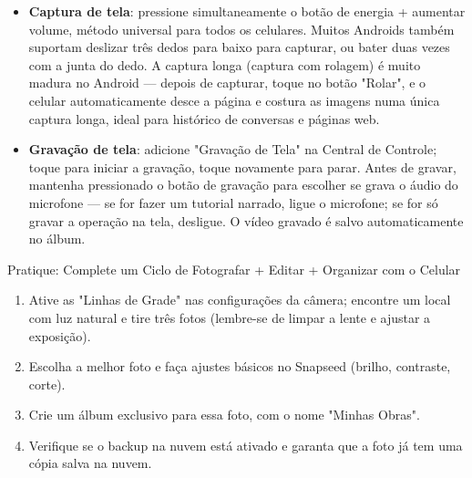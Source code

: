 \begin{itemize}
  \item \textbf{Captura de tela}: pressione simultaneamente o botão de energia + aumentar volume, método universal para todos os celulares. Muitos Androids também suportam deslizar três dedos para baixo para capturar, ou bater duas vezes com a junta do dedo. A captura longa (captura com rolagem) é muito madura no Android — depois de capturar, toque no botão "Rolar", e o celular automaticamente desce a página e costura as imagens numa única captura longa, ideal para histórico de conversas e páginas web.
  \item \textbf{Gravação de tela}: adicione "Gravação de Tela" na Central de Controle; toque para iniciar a gravação, toque novamente para parar. Antes de gravar, mantenha pressionado o botão de gravação para escolher se grava o áudio do microfone — se for fazer um tutorial narrado, ligue o microfone; se for só gravar a operação na tela, desligue. O vídeo gravado é salvo automaticamente no álbum.
\end{itemize}

\begin{tcbpractice}{Pratique: Complete um Ciclo de Fotografar + Editar + Organizar com o Celular}
\begin{enumerate}
  \item Ative as "Linhas de Grade" nas configurações da câmera; encontre um local com luz natural e tire três fotos (lembre-se de limpar a lente e ajustar a exposição).
  \item Escolha a melhor foto e faça ajustes básicos no Snapseed (brilho, contraste, corte).
  \item Crie um álbum exclusivo para essa foto, com o nome "Minhas Obras".
  \item Verifique se o backup na nuvem está ativado e garanta que a foto já tem uma cópia salva na nuvem.
\end{enumerate}

\end{tcbpractice}
